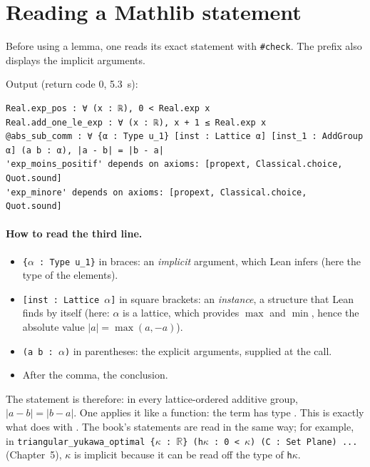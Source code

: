 \section{Reading a Mathlib statement}\label{appC:sec:lire}

Before using a lemma, one reads its exact statement with \texttt{\#check}. The prefix  also displays the
implicit arguments.

\noindent Output (return code $0$, 5.3~s):
\begin{lstlisting}[style=appC,language={}]
Real.exp_pos : ∀ (x : ℝ), 0 < Real.exp x
Real.add_one_le_exp : ∀ (x : ℝ), x + 1 ≤ Real.exp x
@abs_sub_comm : ∀ {α : Type u_1} [inst : Lattice α] [inst_1 : AddGroup α] (a b : α), |a - b| = |b - a|
'exp_moins_positif' depends on axioms: [propext, Classical.choice, Quot.sound]
'exp_minore' depends on axioms: [propext, Classical.choice, Quot.sound]
\end{lstlisting}

\paragraph{How to read the third line.}
\begin{itemize}
\item \texttt{\{$\alpha$ : Type u\_1\}} in braces: an \emph{implicit} argument, which Lean infers (here the type of
the elements).
\item \texttt{[inst : Lattice $\alpha$]} in square brackets: an \emph{instance}, a structure that Lean finds by itself
(here: $\alpha$ is a lattice, which provides $\max$ and $\min$, hence the absolute value $|a|=\max(a,-a)$).
\item \texttt{(a b : $\alpha$)} in parentheses: the explicit arguments, supplied at the call.
\item After the comma, the conclusion.
\end{itemize}
The statement is therefore: in every lattice-ordered additive group, $|a-b|=|b-a|$. One applies it like a function:
the term  has type . This is exactly what  does
with . The book's statements are read in the same way; for example, in
\texttt{triangular\_yukawa\_optimal \{$\kappa$ : $\mathbb R$\} (h$\kappa$ : 0 < $\kappa$) (C : Set Plane) ...}
(Chapter~5), \texttt{$\kappa$} is implicit because it can be read off the type of \texttt{h$\kappa$}.

